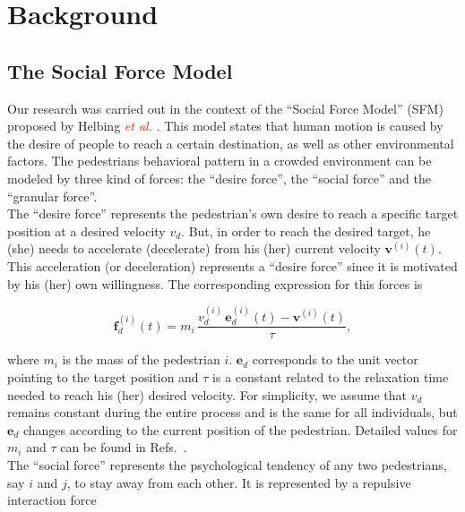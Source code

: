 \documentclass[preprint,12pt]{elsarticle}
\begin{document}
\section{\label{background}Background}

\subsection{\label{sfm}The Social Force Model}

Our research was carried out in the context of the ``Social Force Model'' (SFM) 
proposed by Helbing \textcolor{red} {\textit{et al.}} \cite{Helbing1}. This 
model states that human motion is caused by the desire of people to reach a 
certain destination, as well as other environmental factors. The pedestrians 
behavioral pattern in a crowded environment can be modeled by three kind of 
forces: the ``desire force'', the ``social force'' and the ``granular force''.\\

The ``desire force'' represents the pedestrian's own desire to reach a 
specific target position at a desired velocity $v_d$. But, in order to reach 
the desired target, he (she) needs to accelerate (decelerate) from his (her) 
current velocity $\mathbf{v}^{(i)}(t)$. This acceleration (or deceleration) 
represents a ``desire force'' since it is motivated by his (her) own 
willingness. The corresponding expression for this forces is 

\begin{equation}
        \mathbf{f}_d^ {(i)}(t) =  
m_i\,\displaystyle\frac{v_d^{(i)}\,\mathbf{e}_d^
{(i)}(t)-\mathbf{v}^{(i)}(t)}{\tau}, \label{desired}
\end{equation}

where $m_i$ is the mass of the pedestrian $i$. $\mathbf{e}_d$ 
corresponds to the unit vector pointing to the target position and $\tau$ is a 
constant related to the relaxation time needed to reach his (her) desired 
velocity. For simplicity, we assume that $v_d$ remains constant during the 
entire process and is the same for all individuals, but $\mathbf{e}_d$ changes 
according to the current position of the pedestrian. Detailed values for $m_i$ 
and $\tau$ can be found in Refs.~\cite{Helbing1,Dorso3}. \\

The ``social force'' represents the psychological tendency of any two pedestrians,  
say $i$ and $j$, to stay away from each other. It is represented by a repulsive interaction force 
\end{document}
